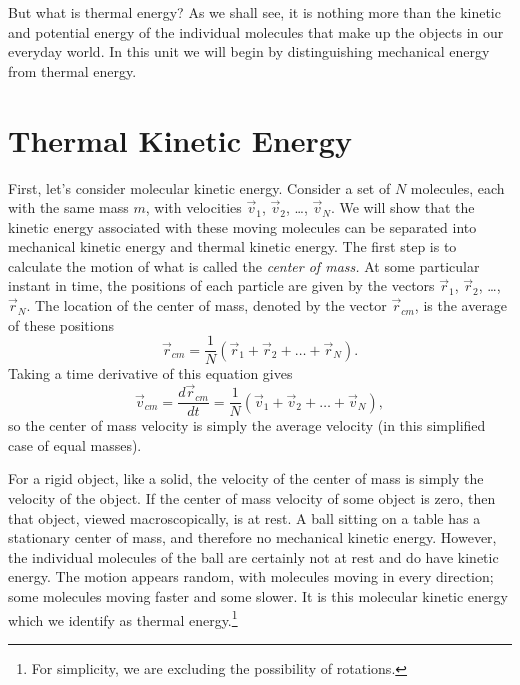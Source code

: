 But what is thermal energy?  As we shall see, it is nothing more than
the kinetic and potential energy of the individual molecules that make
up the objects in our everyday world.  In this unit we will begin by
distinguishing mechanical energy from thermal energy.

\section{Thermal Kinetic Energy}

First, let's consider molecular kinetic energy.  Consider a set of $N$
molecules, each with the same mass $m$, with velocities $\vec v_1$,
$\vec v_2$, \dots, $\vec v_N$.  We will show that the kinetic energy
associated with these moving molecules can be separated into
mechanical kinetic energy and thermal kinetic energy.  The first step
is to calculate the motion of what is called the {\it center of mass.}
At some particular instant in time, the positions of each particle are
given by the vectors $\vec r_1$, $\vec r_2$, \dots, $\vec r_N$.  The
location of the center of mass, denoted by the vector $\vec r_{cm}$,
is the average of these positions
\begin{equation}
\vec r_{cm} = \frac{1}{N}(\vec r_1 + \vec r_2 + \dots + \vec r_N).
\end{equation}
Taking a time derivative of this equation gives
\begin{equation}
\vec v_{cm} = \frac{d\vec r_{cm}}{dt} =
\frac{1}{N}(\vec v_1 + \vec v_2 + \dots + \vec v_N),
\end{equation}
so the center of mass velocity is simply the average velocity (in this
simplified case of equal masses).  

For a rigid object, like a solid, the velocity of the center of mass
is simply the velocity of the object.  If the center of mass velocity
of some object is zero, then that object, viewed macroscopically, is at
rest.  A ball sitting on a table has a stationary center of mass, and
therefore no mechanical kinetic energy.  However, the individual
molecules of the ball are certainly not at rest and do have kinetic
energy.  The motion appears random, with molecules moving in every
direction; some molecules moving faster and some slower.  It is this
molecular kinetic energy which we identify as thermal
energy.\footnote{For simplicity, we are excluding the possibility of
  rotations.}


